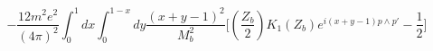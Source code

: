 \begin{equation}
-\frac{12m^{2}e^{2}}{(4\pi)^{2}}\int_{0}^{1}dx\int_{0}^{1-x}dy
\frac{(x+y-1)^{2}}{M_{b}^{2}}
\biggl[\left(\frac{Z_{b}}{2}\right)K_{1}(Z_{b})e^{i(x+y-1)p\wedge
p'}-\frac{1}{2}\biggr]
\end{equation}

